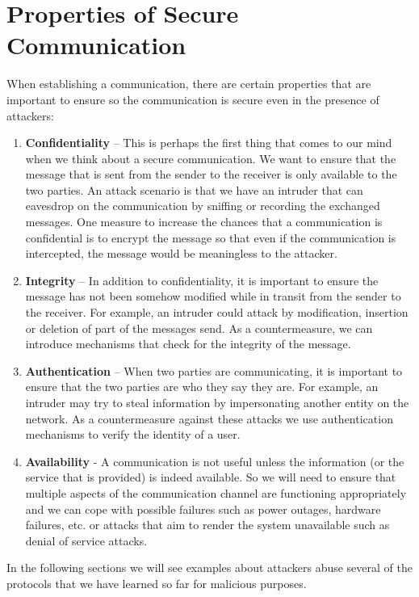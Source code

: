 \documentclass[11pt]{article}
\begin{document}
\section{Properties of Secure Communication}
\label{sec:org8c90464}

When establishing a communication, there are certain properties that are important to ensure so the communication is secure even in the presence of attackers:

\begin{enumerate}
\item \textbf{Confidentiality} – This is perhaps the first thing that comes to our mind when we think about a secure communication. We want to ensure that the message that is sent from the sender to the receiver is only available to the two parties. An attack scenario is that we have an intruder that can eavesdrop on the communication by sniffing or recording the exchanged messages. One measure to increase the chances that a communication is confidential is to encrypt the message so that even if the communication is intercepted, the message would be meaningless to the attacker.
\item \textbf{Integrity} – In addition to confidentiality, it is important to ensure the message has not been somehow modified while in transit from the sender to the receiver. For example, an intruder could attack by modification, insertion or deletion of part of the messages send. As a countermeasure, we can introduce mechanisms that check for the integrity of the message.
\item \textbf{Authentication} – When two parties are communicating, it is important to ensure that the two parties are who they say they are. For example, an intruder may try to steal information by impersonating another entity on the network. As a countermeasure against these attacks we use authentication mechanisms to verify the identity of a user.
\item \textbf{Availability} - A communication is not useful unless the information (or the service that is provided) is indeed available. So we will need to ensure that multiple aspects of the communication channel are functioning appropriately and we can cope with possible failures such as power outages, hardware failures, etc. or attacks that aim to render the system unavailable such as denial of service attacks.
\end{enumerate}

In the following sections we will see examples about attackers abuse several of the protocols that we have learned so far for malicious purposes.
\end{document}
